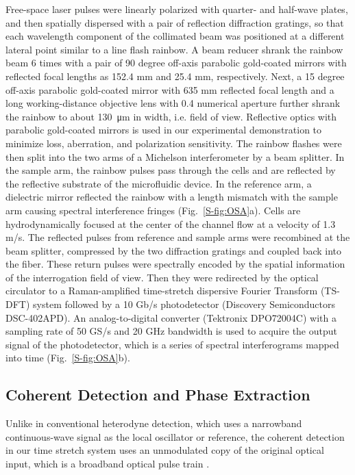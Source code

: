 \documentclass[aps,pra,reprint,longbibliography,superscriptaddress]{revtex4-1}
\begin{document}
Free-space laser pulses were linearly polarized with quarter- and half-wave plates, and then spatially dispersed with a pair of reflection diffraction gratings, so that each wavelength component of the collimated beam was positioned at a different lateral point similar to a line flash rainbow. A beam reducer shrank the rainbow beam 6 times with a pair of 90 degree off-axis parabolic gold-coated mirrors with reflected focal lengths as 152.4 mm and 25.4 mm, respectively. Next, a 15 degree off-axis parabolic gold-coated mirror with 635 mm reflected focal length and a long working-distance objective lens with 0.4 numerical aperture further shrank the rainbow to about \SI{130}{\micro\meter} in width, i.e. field of view. Reflective optics with parabolic gold-coated mirrors is used in our experimental demonstration to minimize loss, aberration, and polarization sensitivity. The rainbow flashes were then split into the two arms of a Michelson interferometer by a beam splitter. In the sample arm, the rainbow pulses pass through the cells and are reflected by the reflective substrate of the microfluidic device. In the reference arm, a dielectric mirror reflected the rainbow with a length mismatch with the sample arm causing spectral interference fringes (Fig.~\ref{S-fig:OSA}a). Cells are hydrodynamically focused at the center of the channel flow at a velocity of 1.3 m/s. The reflected pulses from reference and sample arms were recombined at the beam splitter, compressed by the two diffraction gratings and coupled back into the fiber. These return pulses were spectrally encoded by the spatial information of the interrogation field of view. Then they were redirected by the optical circulator to a Raman-amplified time-stretch dispersive Fourier Transform (TS-DFT) system followed by a 10 Gb/s photodetector (Discovery Semiconductors DSC-402APD). An analog-to-digital converter (Tektronix DPO72004C) with a sampling rate of 50 GS/s and 20 GHz bandwidth is used to acquire the output signal of the photodetector, which is a series of spectral interferograms mapped into time (Fig.~\ref{S-fig:OSA}b). 

\subsection{Coherent Detection and Phase Extraction}

Unlike in conventional heterodyne detection, which uses a narrowband continuous-wave signal as the local oscillator or reference, the coherent detection in our time stretch system uses an unmodulated copy of the original optical input, which is a broadband optical pulse train \cite{buckley2013coherent, devore2014coherent}. 
\end{document}
